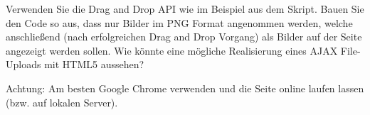 %
\par Verwenden Sie die Drag and Drop API wie im Beispiel aus dem Skript. Bauen
Sie den Code so aus, dass nur Bilder im PNG Format angenommen werden, welche
anschließend (nach erfolgreichen Drag and Drop Vorgang) als Bilder auf der
Seite angezeigt werden sollen. Wie könnte eine mögliche Realisierung eines AJAX
File-Uploads mit HTML5 aussehen?
%
\par Achtung: Am besten Google Chrome verwenden und die Seite online laufen
lassen (bzw. auf lokalen Server).